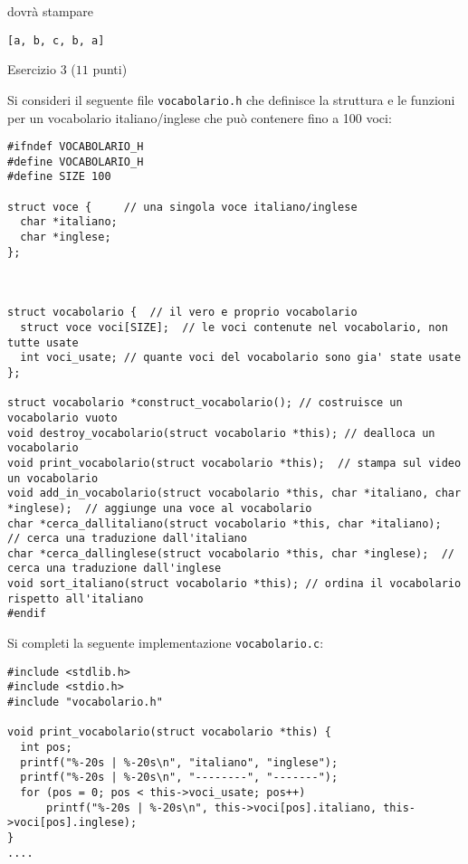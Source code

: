 \documentclass[12pt]{article}
\begin{document}
\noindent
dovr\`a stampare
%
{\scriptsize
\begin{verbatim}
[a, b, c, b, a]
\end{verbatim}}

\begin{center}{\Large Esercizio 3} ($11$ punti)\end{center}
%
Si consideri il seguente file \texttt{vocabolario.h} che definisce la struttura e le funzioni per un vocabolario italiano/inglese
che pu\`o contenere fino a 100 voci:

{\scriptsize
\begin{verbatim}
#ifndef VOCABOLARIO_H
#define VOCABOLARIO_H
#define SIZE 100

struct voce {     // una singola voce italiano/inglese
  char *italiano;
  char *inglese;
};



struct vocabolario {  // il vero e proprio vocabolario
  struct voce voci[SIZE];  // le voci contenute nel vocabolario, non tutte usate
  int voci_usate; // quante voci del vocabolario sono gia' state usate
};

struct vocabolario *construct_vocabolario(); // costruisce un vocabolario vuoto
void destroy_vocabolario(struct vocabolario *this); // dealloca un vocabolario
void print_vocabolario(struct vocabolario *this);  // stampa sul video un vocabolario
void add_in_vocabolario(struct vocabolario *this, char *italiano, char *inglese);  // aggiunge una voce al vocabolario
char *cerca_dallitaliano(struct vocabolario *this, char *italiano);  // cerca una traduzione dall'italiano
char *cerca_dallinglese(struct vocabolario *this, char *inglese);  // cerca una traduzione dall'inglese
void sort_italiano(struct vocabolario *this); // ordina il vocabolario rispetto all'italiano
#endif
\end{verbatim}}

\noindent
Si completi la seguente implementazione \texttt{vocabolario.c}:

{\scriptsize
\begin{verbatim}
#include <stdlib.h>
#include <stdio.h>
#include "vocabolario.h"

void print_vocabolario(struct vocabolario *this) {
  int pos;
  printf("%-20s | %-20s\n", "italiano", "inglese");
  printf("%-20s | %-20s\n", "--------", "-------");
  for (pos = 0; pos < this->voci_usate; pos++)
      printf("%-20s | %-20s\n", this->voci[pos].italiano, this->voci[pos].inglese);
}
....
\end{verbatim}}
\end{document}
